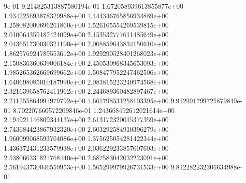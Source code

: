 9e-01	9.214825313887580194e-01	1.672058939613855877e+00	1.934225693878329988e+00	1.444346765856934889e+00	1.258082000696261860e+00	1.526165554269539815e+00	2.010064359182424099e+00	2.153532777611485649e+00	2.043651730030321190e+00	2.008859643834150610e+00	1.862576924789553612e+00	1.929290528401268023e+00	2.150836360639006184e+00	2.450530968345653093e+00	1.985265362669699662e+00	1.508477952247462506e+00	1.640698085010187990e+00	2.083815223240974568e+00	2.321639658762411962e+00	2.244689360482897467e+00	2.211255864991979792e+00	1.661798531258103395e+00	9.912991799725879849e-01	8.702207660572209846e-01	1.243668492612021614e+00	2.194921146809344137e+00	2.613172320015377359e+00	2.743684423867932320e+00	2.603292584910396279e+00	1.960099068593704086e+00	1.375625054281422344e+00	1.436372431233579938e+00	2.036229233857007603e+00	2.538066331821768440e+00	2.687583042032223091e+00	2.561943730046559953e+00	1.565299979926731533e+00	9.812282232306634988e-01
